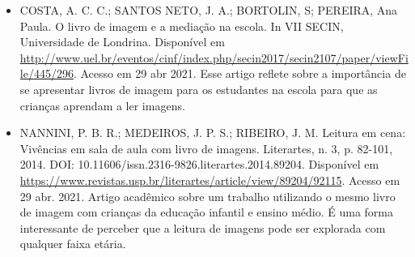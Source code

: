 \documentclass[11pt]{extarticle}
\begin{document}
\begin{itemize}
\item COSTA, A. C. C.; SANTOS NETO, J. A.; BORTOLIN, S; PEREIRA, Ana Paula. O livro de imagem e a mediação na escola. 
In VII SECIN, Universidade de Londrina. Disponível em \url{http://www.uel.br/eventos/cinf/index.php/secin2017/secin2107/paper/viewFile/445/296}. 
Acesso em 29 abr 2021. 
Esse artigo reflete sobre a importância de se apresentar livros de imagem para os estudantes na escola para que as crianças aprendam a ler imagens. 

\item NANNINI, P. B. R.; MEDEIROS, J. P. S.; RIBEIRO, J. M. Leitura em cena: Vivências em sala de aula com livro de imagens. 
Literartes, n. 3, p. 82-101, 2014. DOI: 10.11606/issn.2316-9826.literartes.2014.89204. 
Disponível em \url{https://www.revistas.usp.br/literartes/article/view/89204/92115}. Acesso em 29 abr. 2021. 
Artigo acadêmico sobre um trabalho utilizando o mesmo livro de imagem com crianças da educação infantil e ensino médio. 
É uma forma interessante de perceber que a leitura de imagens pode ser explorada com qualquer faixa etária. 
\end{itemize}
\end{document}
